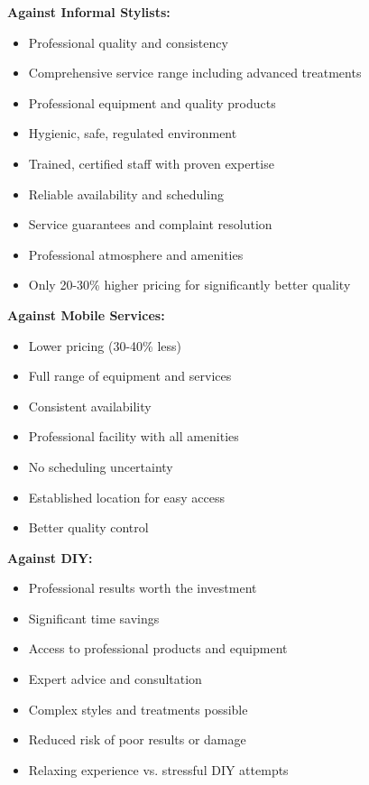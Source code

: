 \textbf{Against Informal Stylists:}
\begin{itemize}[leftmargin=2em]
    \item Professional quality and consistency
    \item Comprehensive service range including advanced treatments
    \item Professional equipment and quality products
    \item Hygienic, safe, regulated environment
    \item Trained, certified staff with proven expertise
    \item Reliable availability and scheduling
    \item Service guarantees and complaint resolution
    \item Professional atmosphere and amenities
    \item Only 20-30\% higher pricing for significantly better quality
\end{itemize}

\textbf{Against Mobile Services:}
\begin{itemize}[leftmargin=2em]
    \item Lower pricing (30-40\% less)
    \item Full range of equipment and services
    \item Consistent availability
    \item Professional facility with all amenities
    \item No scheduling uncertainty
    \item Established location for easy access
    \item Better quality control
\end{itemize}

\textbf{Against DIY:}
\begin{itemize}[leftmargin=2em]
    \item Professional results worth the investment
    \item Significant time savings
    \item Access to professional products and equipment
    \item Expert advice and consultation
    \item Complex styles and treatments possible
    \item Reduced risk of poor results or damage
    \item Relaxing experience vs. stressful DIY attempts
\end{itemize}

